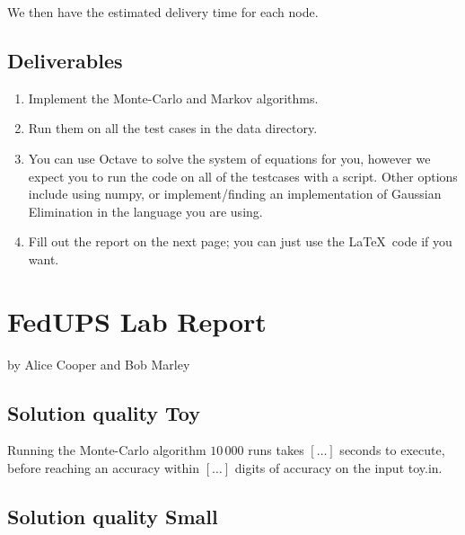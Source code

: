 \documentclass{tufte-handout}
\begin{document}
We then have the estimated delivery time for each node.

\subsection{Deliverables}

\begin{enumerate}
\item Implement the Monte-Carlo and Markov algorithms.
\item Run them on all the test cases in the data directory.
\item You can use Octave to solve the system of equations for you, 
    however we expect you to run the code on all of the testcases with a script.
    Other options include using numpy, or implement/finding an implementation of
        Gaussian Elimination in the language you are using.
\item Fill out the report on the next page; you can just use the
  \LaTeX\ code if you want.
\end{enumerate}

\newpage


\newpage
\section{FedUPS Lab Report}


by Alice Cooper and Bob Marley


\subsection{Solution quality Toy}

Running the Monte-Carlo algorithm $10\,000$ runs takes $[\ldots]$ seconds to execute, before reaching an accuracy within $[\ldots]$ digits
of accuracy on the input toy.in.


\subsection{Solution quality Small}
\end{document}
